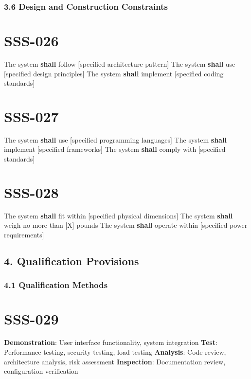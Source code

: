 \subsubsection{3.6 Design and Construction Constraints}

\section{SSS-026}\label{SSS-026}

The system \textbf{shall} follow [specified architecture pattern]
The system \textbf{shall} use [specified design principles]
The system \textbf{shall} implement [specified coding standards]

\section{SSS-027}\label{SSS-027}

The system \textbf{shall} use [specified programming languages]
The system \textbf{shall} implement [specified frameworks]
The system \textbf{shall} comply with [specified standards]

\section{SSS-028}\label{SSS-028}

The system \textbf{shall} fit within [specified physical dimensions]
The system \textbf{shall} weigh no more than [X] pounds
The system \textbf{shall} operate within [specified power requirements]

\subsection{4. Qualification Provisions}

\subsubsection{4.1 Qualification Methods}

\section{SSS-029}\label{SSS-029}

\textbf{Demonstration}: User interface functionality, system integration
\textbf{Test}: Performance testing, security testing, load testing
\textbf{Analysis}: Code review, architecture analysis, risk assessment
\textbf{Inspection}: Documentation review, configuration verification

